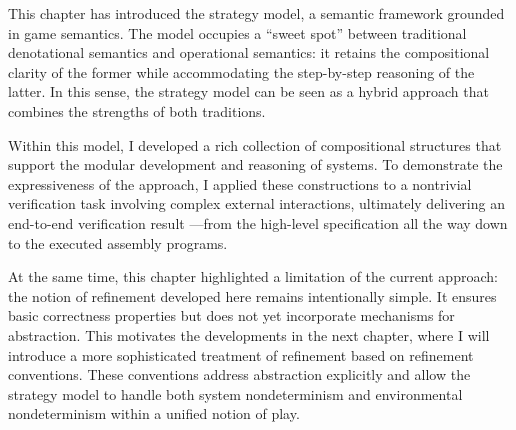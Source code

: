 This chapter has introduced the strategy model,
a semantic framework grounded in game semantics.
The model occupies a ``sweet spot''
between traditional denotational semantics
and operational semantics:
it retains the compositional clarity
of the former
while accommodating the step-by-step reasoning
of the latter.
In this sense,
the strategy model can be seen
as a hybrid approach
that combines the strengths of both traditions.

Within this model,
I developed a rich collection of compositional structures
that support the modular development and reasoning of systems.
To demonstrate the expressiveness
of the approach,
I applied these constructions
to a nontrivial verification task
involving complex external interactions,
ultimately delivering an end-to-end verification result%
---from the high-level specification
all the way down to the executed assembly programs.

At the same time,
this chapter highlighted a limitation of the current approach:
the notion of refinement developed here
remains intentionally simple.
It ensures basic correctness properties
but does not yet incorporate mechanisms for abstraction.
This motivates the developments in the next chapter,
where I will introduce
a more sophisticated treatment of refinement
based on refinement conventions.
These conventions address abstraction explicitly
and allow the strategy model
to handle both system nondeterminism and environmental nondeterminism
within a unified notion of play.
